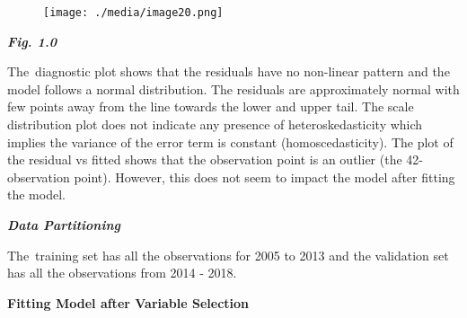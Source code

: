 \documentclass[12pt]{article}
\begin{document}
\begin{figure}[H]
	\begin{Center}
		\texttt{[image: ./media/image20.png]}
	\end{Center}
\end{figure}



\par

\begin{justify}
{\fontsize{10pt}{12.0pt}\selectfont \textbf{\textit{Fig. 1.0}}\par}
\end{justify}\par

\begin{justify}
The\ diagnostic plot shows that the residuals have no non-linear pattern and the model follows a normal distribution. The residuals are approximately normal with few points away from the line towards the lower and upper tail. The scale distribution plot does not indicate any presence of heteroskedasticity which implies the variance of the error term is constant (homoscedasticity).  The plot of the residual vs fitted shows that the observation point is an outlier (the 42-observation point). However, this does not seem to impact the model after fitting the model. 
\end{justify}\par


\vspace{\baselineskip}
\begin{justify}
\textbf{\textit{Data Partitioning}}
\end{justify}\par

\begin{justify}
The\ training set has all the observations for 2005 to 2013 and the validation set has all the observations from 2014 - 2018.  
\end{justify}\par

\tab \tab \tab \tab \tab 
\vspace{\baselineskip}\begin{adjustwidth}{2.25in}{0.0in}
\begin{justify}
\textbf{Fitting Model after Variable Selection}
\end{justify}\par

\end{adjustwidth}
\end{document}
